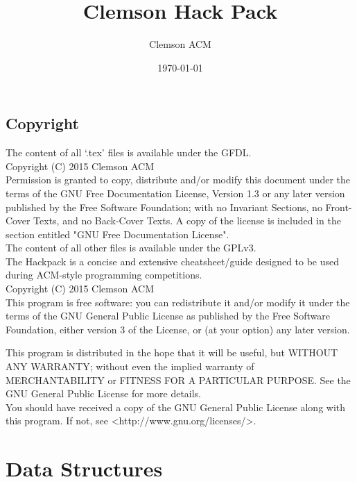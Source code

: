 \documentclass[letterpaper, 10pt]{report}
\title{Clemson Hack Pack}
\author{Clemson ACM}
\date{\today}
\begin{document}
\maketitle

\section*{Copyright}
The content of all `.tex' files is available under the GFDL. \\
Copyright (C)  2015  Clemson ACM \\
Permission is granted to copy, distribute and/or modify this document
under the terms of the GNU Free Documentation License, Version 1.3
or any later version published by the Free Software Foundation;
with no Invariant Sections, no Front-Cover Texts, and no Back-Cover Texts.
A copy of the license is included in the section entitled "GNU
Free Documentation License".\\

The content of all other files is available under the GPLv3. \\
The Hackpack is a concise and extensive cheatsheet/guide designed to be used during ACM-style programming competitions. \\
Copyright (C)  2015  Clemson ACM \\

This program is free software: you can redistribute it and/or modify
it under the terms of the GNU General Public License as published by
the Free Software Foundation, either version 3 of the License, or
(at your option) any later version.

This program is distributed in the hope that it will be useful,
but WITHOUT ANY WARRANTY; without even the implied warranty of
MERCHANTABILITY or FITNESS FOR A PARTICULAR PURPOSE\@. See the
GNU General Public License for more details. \\

You should have received a copy of the GNU General Public License
along with this program. If not, see <http://www.gnu.org/licenses/>.


\break



\tableofcontents

\chapter{Data Structures}




\end{document}
